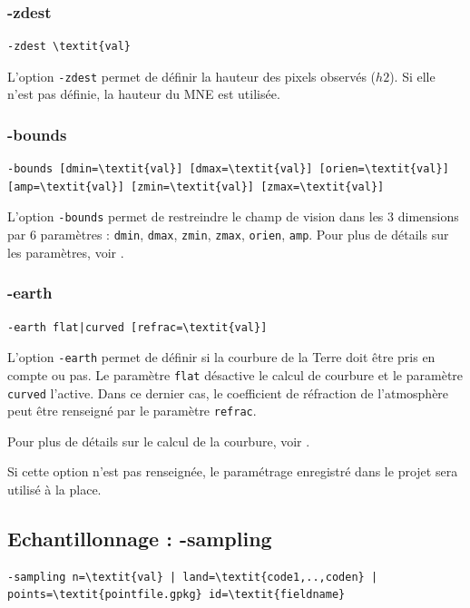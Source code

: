 \documentclass{report}
\begin{document}
\subsubsection{-zdest}
\begin{Verbatim}[commandchars=\\\{\}]
-zdest \textit{val}
\end{Verbatim}
L'option \verb|-zdest| permet de définir la hauteur des pixels observés ($h2$). Si elle n'est pas définie, la hauteur du MNE est utilisée.

\subsubsection{-bounds}
\begin{Verbatim}[commandchars=\\\{\}]
-bounds [dmin=\textit{val}] [dmax=\textit{val}] [orien=\textit{val}] [amp=\textit{val}] [zmin=\textit{val}] [zmax=\textit{val}]
\end{Verbatim}
L'option \verb|-bounds| permet de restreindre le champ de vision dans les 3 dimensions par 6 paramètres : \verb|dmin|, \verb|dmax|, \verb|zmin|, \verb|zmax|, \verb|orien|, \verb|amp|. Pour plus de détails sur les paramètres, voir .

\subsubsection{-earth}
\begin{Verbatim}[commandchars=\\\{\}]
-earth flat|curved [refrac=\textit{val}]
\end{Verbatim}

L'option \verb|-earth| permet de définir si la courbure de la Terre doit être pris en compte ou pas. Le paramètre \verb|flat| désactive le calcul de courbure et le paramètre \verb|curved| l'active. Dans ce dernier cas, le coefficient de réfraction de l'atmosphère peut être renseigné par le paramètre \verb|refrac|.

Pour plus de détails sur le calcul de la courbure, voir .

Si cette option n'est pas renseignée, le paramétrage enregistré dans le projet sera utilisé à la place.

\subsection{Echantillonnage : -sampling}
\begin{Verbatim}[commandchars=\\\{\}]
-sampling n=\textit{val} | land=\textit{code1,..,coden} | points=\textit{pointfile.gpkg} id=\textit{fieldname}
\end{Verbatim}
\end{document}
